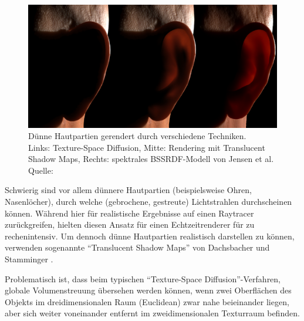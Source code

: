\documentclass[ngerman,runningheads,a4paper]{llncs}[2018/03/10]
\begin{document}
\begin{figure}
  \centering
  \includegraphics[scale=0.2,keepaspectratio]{./images/translucent-shadow-maps.jpg}
  \caption{
    Dünne Hautpartien gerendert durch verschiedene Techniken.\\\hspace{\textwidth}
    Links: Texture-Space Diffusion, Mitte: Rendering mit Translucent Shadow Maps, Rechts: spektrales BSSRDF-Modell von Jensen et al.\\\hspace{\textwidth}Quelle: \citet{efficient-human-skin-rendering}
  }
  \label{fig:tsm-result}
\end{figure}

Schwierig sind vor allem dünnere Hautpartien (beispielsweise Ohren, Nasenlöcher), durch welche (gebrochene, gestreute) Lichtstrahlen durchscheinen können.
Während \citet{realistic-human-face-rendering-matrix} hier für realistische Ergebnisse auf einen Raytracer zurückgreifen, hielten \citet{efficient-human-skin-rendering} diesen Ansatz für einen Echtzeitrenderer für zu rechenintensiv.
Um dennoch dünne Hautpartien realistisch darstellen zu können, verwenden \citeauthor{efficient-human-skin-rendering} sogenannte \enquote{Translucent Shadow Maps} von Dachsbacher und Stamminger \cite{translucent-shadow-maps}.

Problematisch ist, dass beim typischen \enquote{Texture-Space Diffusion}-Verfahren, globale Volumenstreuung übersehen werden können, wenn zwei Oberflächen des Objekts im dreidimensionalen Raum (Euclidean) zwar nahe beieinander liegen, aber sich weiter voneinander entfernt im zweidimensionalen Texturraum befinden.
\end{document}
